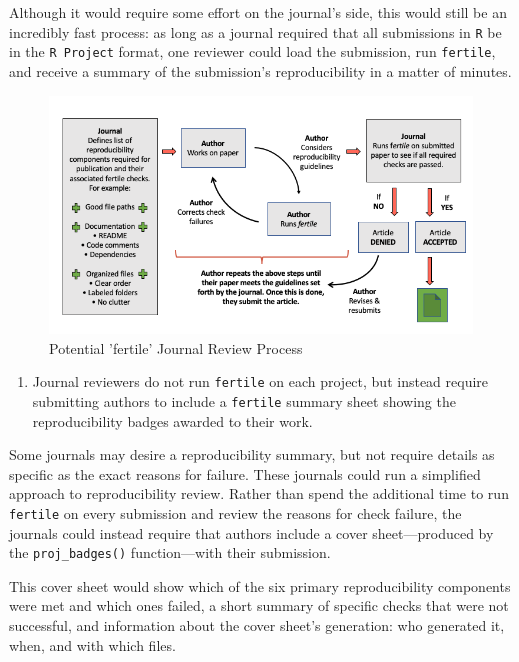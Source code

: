 \documentclass[12pt,twoside]{reedthesis}
\providecommand{\tightlist}{%
  \setlength{\itemsep}{0pt}\setlength{\parskip}{0pt}}
\begin{document}
Although it would require some effort on the journal's side, this would still be an incredibly fast process: as long as a journal required that all submissions in \texttt{R} be in the \texttt{R\ Project} format, one reviewer could load the submission, run \texttt{fertile}, and receive a summary of the submission's reproducibility in a matter of minutes.
\begin{figure}
\includegraphics[width=1\linewidth]{figure/journal-process} \caption{Potential 'fertile' Journal Review Process}\label{fig:unnamed-chunk-58}
\end{figure}
\begin{enumerate}
\def\labelenumi{\arabic{enumi}.}
\setcounter{enumi}{1}
\tightlist
\item
  Journal reviewers do not run \texttt{fertile} on each project, but instead require submitting authors to include a \texttt{fertile} summary sheet showing the reproducibility badges awarded to their work.
\end{enumerate}
Some journals may desire a reproducibility summary, but not require details as specific as the exact reasons for failure. These journals could run a simplified approach to reproducibility review. Rather than spend the additional time to run \texttt{fertile} on every submission and review the reasons for check failure, the journals could instead require that authors include a cover sheet---produced by the \texttt{proj\_badges()} function---with their submission.

This cover sheet would show which of the six primary reproducibility components were met and which ones failed, a short summary of specific checks that were not successful, and information about the cover sheet's generation: who generated it, when, and with which files.
\end{document}
